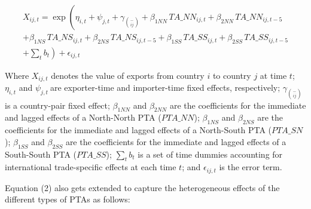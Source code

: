 \begin{multline}
    X_{ij,t} = \exp\left(\eta_{i,t} + \psi_{j,t} + \gamma_{\binom{-}{ij}} + \beta_{1NN} \, TA\_NN_{ij,t} + \beta_{2NN} \, TA\_NN_{ij,t-5} \right. \\
    + \beta_{1NS} \, TA\_NS_{ij,t} + \beta_{2NS} \, TA\_NS_{ij,t-5} + \beta_{1SS} \, TA\_SS_{ij,t} + \beta_{2SS} \, TA\_SS_{ij,t-5} \\
    + \left. \sum_{t} b_{t} \right) + \epsilon_{ij,t}
\end{multline}

Where \(X_{ij,t}\)\hspace{0pt} denotes the value of exports from country
\(i\) to country \(j\) at time \(t\); \(\eta_{i,t}\) and
\(\psi_{j,t}\ \)are exporter-time and importer-time fixed effects,
respectively; \(\gamma_{\binom{-}{ij}}\) is a country-pair fixed effect;
\hspace{0pt}\(\beta_{1NN}\) and \(\beta_{2NN}\) are the coefficients for
the immediate and lagged effects of a North-North PTA (\(PTA\_ NN\));
\hspace{0pt}\hspace{0pt}\(\beta_{1NS}\) and \(\beta_{2NS}\) are the
coefficients for the immediate and lagged effects of a North-South PTA
(\(PTA\_ SN\)); \hspace{0pt}\hspace{0pt}\(\beta_{1SS}\) and
\(\beta_{2SS}\) are the coefficients for the immediate and lagged
effects of a South-South PTA (\(PTA\_ SS\)); \(\sum_{t}^{}b_{t}\) is a
set of time dummies accounting for international trade-specific effects
at each time \(t\); and \(\epsilon_{ij,t}\) is the error term.

Equation (2) also gets extended to capture the heterogeneous effects of
the different types of PTAs as follows:


